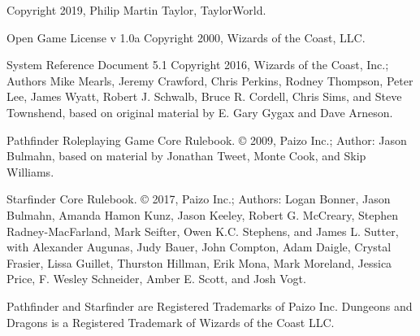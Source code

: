 \documentclass[12pt]{extreport}
\begin{document}
\vfill
\footnotesize
\begin{center}
 Copyright 2019, Philip Martin Taylor, TaylorWorld.
 
 Open Game License v 1.0a Copyright 2000, Wizards of the Coast, LLC.
 
 System Reference Document 5.1 Copyright 2016, Wizards of the Coast, Inc.; Authors Mike Mearls, Jeremy Crawford, Chris Perkins, Rodney Thompson, Peter Lee, James Wyatt, Robert J. Schwalb, Bruce R. Cordell, Chris Sims, and Steve Townshend, based on original material by E. Gary Gygax and Dave Arneson.
 
 Pathfinder Roleplaying Game Core Rulebook. © 2009, Paizo Inc.; Author: Jason Bulmahn, based on material by Jonathan Tweet, Monte Cook, and Skip Williams.
 
 Starfinder Core Rulebook. © 2017, Paizo Inc.; Authors: Logan Bonner, Jason Bulmahn, Amanda Hamon Kunz, Jason Keeley, Robert G. McCreary, Stephen Radney-MacFarland, Mark Seifter, Owen K.C. Stephens, and James L. Sutter, with Alexander Augunas, Judy Bauer, John Compton, Adam Daigle, Crystal Frasier, Lissa Guillet, Thurston Hillman, Erik Mona, Mark Moreland, Jessica Price, F. Wesley Schneider, Amber E. Scott, and Josh Vogt.
 
 Pathfinder and Starfinder are Registered Trademarks of Paizo Inc. Dungeons and Dragons is a Registered Trademark of Wizards of
the Coast LLC.
\end{center}
 
\end{document}
